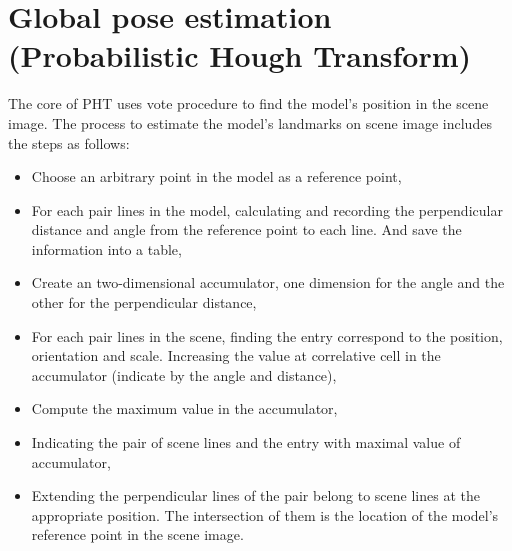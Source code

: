 \section{Global pose estimation (Probabilistic Hough Transform)}
The core of PHT uses vote procedure to find the model's position in the scene image. The process to estimate the model's landmarks on scene image includes the steps as follows:
\begin{itemize}
\item Choose an arbitrary point in the model as a reference point,
\item For each pair lines in the model, calculating and recording the perpendicular distance and angle from the reference point to each line. And save the information into a table,
\item Create an two-dimensional accumulator, one dimension for the angle and the other for the perpendicular distance,
\item For each pair lines in the scene, finding the entry correspond to the position, orientation and scale. Increasing the value at correlative cell in the accumulator (indicate by the angle and distance),
\item Compute the maximum value in the accumulator,
\item Indicating the pair of scene lines and the entry with maximal value of accumulator,
\item Extending the perpendicular lines of the pair belong to scene lines at the appropriate position. The intersection of them is the location of the model's reference point in the scene image.
\end{itemize}
